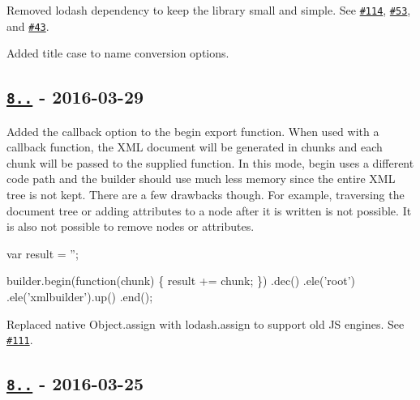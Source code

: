 \begin{DoxyItemize}
\item Removed lodash dependency to keep the library small and simple. See \href{https://github.com/oozcitak/xmlbuilder-js/issues/114}{\tt \#114}, \href{https://github.com/oozcitak/xmlbuilder-js/issues/53}{\tt \#53}, and \href{https://github.com/oozcitak/xmlbuilder-js/issues/43}{\tt \#43}.
\item Added title case to name conversion options.
\end{DoxyItemize}

\subsection*{\href{https://github.com/oozcitak/xmlbuilder-js/compare/v8.0.0...v8.1.0}{\tt 8..} -\/ 2016-\/03-\/29}


\begin{DoxyItemize}
\item Added the callback option to the {\ttfamily begin} export function. When used with a callback function, the X\+ML document will be generated in chunks and each chunk will be passed to the supplied function. In this mode, {\ttfamily begin} uses a different code path and the builder should use much less memory since the entire X\+ML tree is not kept. There are a few drawbacks though. For example, traversing the document tree or adding attributes to a node after it is written is not possible. It is also not possible to remove nodes or attributes.
\end{DoxyItemize}


\begin{DoxyCode}
var result = '';

builder.begin(function(chunk) \{ result += chunk; \})
  .dec()
  .ele('root')
    .ele('xmlbuilder').up()
  .end();
\end{DoxyCode}



\begin{DoxyItemize}
\item Replaced native {\ttfamily Object.\+assign} with {\ttfamily lodash.\+assign} to support old JS engines. See \href{https://github.com/oozcitak/xmlbuilder-js/issues/111}{\tt \#111}.
\end{DoxyItemize}

\subsection*{\href{https://github.com/oozcitak/xmlbuilder-js/compare/v7.0.0...v8.0.0}{\tt 8..} -\/ 2016-\/03-\/25}



